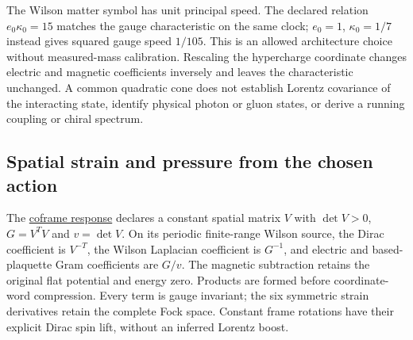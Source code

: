 The Wilson matter symbol has unit principal speed. The declared relation
$e_0\kappa_0=15$ matches the gauge characteristic on the same clock;
$e_0=1$, $\kappa_0=1/7$ instead gives squared gauge speed $1/105$.
This is an allowed architecture choice without measured-mass calibration.
Rescaling the hypercharge coordinate changes electric and magnetic
coefficients inversely and leaves the characteristic unchanged.
A common quadratic cone does not establish Lorentz covariance of the
interacting state, identify physical photon or gluon states, or derive
a running coupling or chiral spectrum.

\subsection{Spatial strain and pressure from the chosen action}

The \href{https://github.com/FloatingPragma/observer-patch-holography/blob/main/model/particle_geometric_response/PROOF.md}{coframe response}
declares a constant spatial matrix $V$ with $\det V>0$,
$G=V^TV$ and $v=\det V$. On its periodic finite-range Wilson source, the
Dirac coefficient is $V^{-T}$, the Wilson Laplacian coefficient is
$G^{-1}$, and electric and based-plaquette Gram coefficients are
$G/v$. The magnetic subtraction retains the original flat potential
and energy zero. Products are formed before coordinate-word
compression. Every term is gauge invariant; the six symmetric strain
derivatives retain the complete Fock space. Constant frame rotations
have their explicit Dirac spin lift, without an inferred Lorentz boost.

